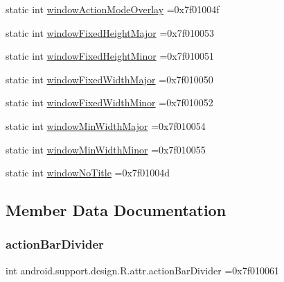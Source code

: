 \begin{DoxyCompactItemize}
\item 
static int \hyperlink{classandroid_1_1support_1_1design_1_1R_1_1attr_a636b996e7c817a05b1b9d5726df2cbde}{window\+Action\+Mode\+Overlay} =0x7f01004f
\item 
static int \hyperlink{classandroid_1_1support_1_1design_1_1R_1_1attr_a7f3cc481bef4ffdd7d3986407ba955d9}{window\+Fixed\+Height\+Major} =0x7f010053
\item 
static int \hyperlink{classandroid_1_1support_1_1design_1_1R_1_1attr_a0428452c793d06bca6f0778aad10a812}{window\+Fixed\+Height\+Minor} =0x7f010051
\item 
static int \hyperlink{classandroid_1_1support_1_1design_1_1R_1_1attr_a1fcd76e231eda73c25225c029aa4ef39}{window\+Fixed\+Width\+Major} =0x7f010050
\item 
static int \hyperlink{classandroid_1_1support_1_1design_1_1R_1_1attr_ad4eb274132a1e6ce7842da04eb6f1285}{window\+Fixed\+Width\+Minor} =0x7f010052
\item 
static int \hyperlink{classandroid_1_1support_1_1design_1_1R_1_1attr_a57d319f552fc373780a074bf8ab8d077}{window\+Min\+Width\+Major} =0x7f010054
\item 
static int \hyperlink{classandroid_1_1support_1_1design_1_1R_1_1attr_a0d5fe2b5cabad2d90ed3efb075a1ac99}{window\+Min\+Width\+Minor} =0x7f010055
\item 
static int \hyperlink{classandroid_1_1support_1_1design_1_1R_1_1attr_a9dc70da163b81fffb9b6eb85e61ee72f}{window\+No\+Title} =0x7f01004d
\end{DoxyCompactItemize}


\subsection{Member Data Documentation}
\mbox{\label{classandroid_1_1support_1_1design_1_1R_1_1attr_a414b92e66e21228ba492f0816373c4fe}} 
\subsubsection{\texorpdfstring{action\+Bar\+Divider}{actionBarDivider}}
{\footnotesize\ttfamily int android.\+support.\+design.\+R.\+attr.\+action\+Bar\+Divider =0x7f010061\hspace{0.3cm}{\ttfamily [static]}}

